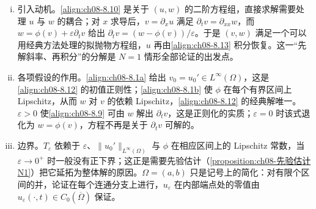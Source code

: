 \documentclass[../../main.tex]{subfiles}%
\begin{document}
\begin{remark}\label{remark:ch08-局部适定动机}
\begin{enumerate}[(i)]
\item 引入动机。\eqref{align:ch08-8.10} 是关于 $(u,w)$ 的二阶方程组，直接求解需要处理 $u$ 与 $w$ 的耦合；对 $x$ 求导后，$v=\partial_xu$ 满足 $\partial_tv=\partial_{xx}w$，而 $w=\phi(v)+\varepsilon\partial_tv$ 给出 $\partial_tv=(w-\phi(v))/\varepsilon$。于是 $(v,w)$ 满足一个可以用经典方法处理的拟抛物方程组，$u$ 再由\eqref{align:ch08-8.13} 积分恢复。这一“先解斜率、再积分”的分解是 $N=1$ 情形全部论证的出发点。
\item 各项假设的作用。\eqref{align:ch08-8.1a} 给出 $v_0=u_0'\in L^\infty(\Omega)$，这是\eqref{align:ch08-8.12} 的初值正则性；\eqref{align:ch08-8.1b} 使 $\phi$ 在每个有界区间上 Lipschitz，从而 $w$ 对 $v$ 的依赖 Lipschitz，\eqref{align:ch08-8.12} 的经典解唯一。$\varepsilon>0$ 使\eqref{align:ch08-8.9} 可由 $w$ 解出 $\partial_tv$，这是正则化的实质；$\varepsilon=0$ 时该式退化为 $w=\phi(v)$，方程不再是关于 $\partial_tv$ 可解的。
\item 边界。$T_\varepsilon$ 依赖于 $\varepsilon$、$\|u_0'\|_{L^\infty(\Omega)}$ 与 $\phi$ 在相应区间上的 Lipschitz 常数，当 $\varepsilon\to0^+$ 时一般没有正下界；这正是需要先验估计（\cref{proposition:ch08-先验估计N1}）把它延拓为整体解的原因。$\Omega=(a,b)$ 只是记号上的简化：对有限个区间的并，论证在每个连通分支上进行，$u_\varepsilon$ 在内部端点处的零值由 $u_\varepsilon(\cdot,t)\in C_0(\overline\Omega)$ 保证。
\end{enumerate}
\end{remark}
\end{document}
